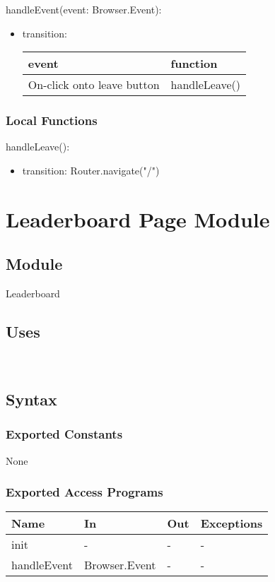 \documentclass[12pt, titlepage]{article}
\begin{document}
\noindent handleEvent(event: Browser.Event):
\begin{itemize}
\item transition: \begin{tabular}{p{5cm} p{4cm}}
\hline
\textbf{event} & \textbf{function} \\
\hline
On-click onto leave button & handleLeave() \\
\hline
\end{tabular}
    
\end{itemize}

\subsubsection{Local Functions}

\noindent handleLeave():
\begin{itemize}
\item transition: Router.navigate("/")
\end{itemize}


\newpage

\section{Leaderboard Page Module} \label{Leaderboard}
\subsection{Module}
Leaderboard
\subsection{Uses}
\\

\subsection{Syntax}

\subsubsection{Exported Constants}
None
\subsubsection{Exported Access Programs}
\begin{center}
\begin{tabular}{p{2cm} p{4cm} p{4cm} p{2cm}}
\hline
\textbf{Name} & \textbf{In} & \textbf{Out} & \textbf{Exceptions} \\
\hline
init & - & - & - \\
handleEvent & Browser.Event & - & -\\
\hline
\end{tabular}
\end{center}
\end{document}
